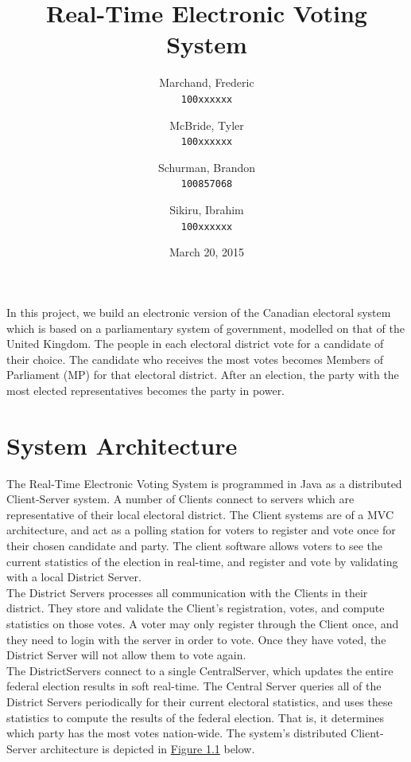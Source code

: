 \documentclass[11pt,english]{article}
\begin{document}
\title{\bf Real-Time Electronic Voting System}

\author{
    Marchand, Frederic \\
    \texttt{100xxxxxx}
    \and
    McBride, Tyler \\
    \texttt{100xxxxxx}
    \and
    Schurman, Brandon \\
    \texttt{100857068}
    \and
    Sikiru, Ibrahim \\
    \texttt{100xxxxxx}
}

\date{March 20, 2015}

\maketitle

In this project, we build an electronic version of the Canadian electoral system which is based
on a parliamentary system of government, modelled on that of the United Kingdom. The
people
in each electoral district vote for a candidate of their choice. The candidate who
receives the
most votes becomes Members of Parliament (MP) for that electoral district. After an election, the party with the most elected
representatives
becomes the party in power.


\section{System Architecture}

The Real-Time Electronic Voting System is programmed in Java as a distributed Client-Server
system. A number of Clients connect to servers which are representative of their local
electoral district. The Client systems are of a MVC architecture, and act as a polling
station for voters to register and vote once for their chosen candidate and party. The
client software allows voters to see the current statistics of the election in
real-time, and register and vote by validating with a local District Server. 
\vspace{2mm} \\
The District Servers processes all communication with the Clients in their district. They
store and validate the Client's registration, votes, and compute statistics on those
votes. A voter may only register through the Client once, and they need to login with the
server in order to vote. Once they have voted, the District Server will not allow
them to vote again.
\vspace{2mm} \\
The DistrictServers connect to a single CentralServer, which updates the entire federal election
results in soft real-time. The Central Server queries all of the District Servers
periodically for their current electoral statistics, and uses these statistics to compute
the results of the federal election. That is, it determines which party has the most votes
nation-wide. The system's distributed Client-Server architecture is depicted in
\underline{Figure 1.1} below. \\
\end{document}

